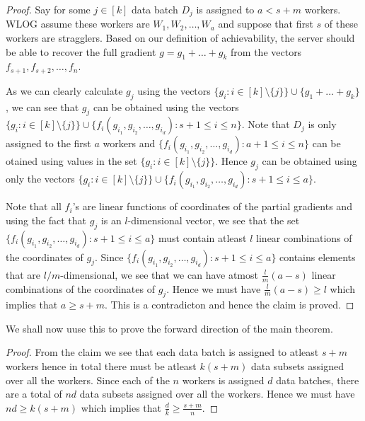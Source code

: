 \documentclass{report}
\theoremstyle{definition}
\begin{document}
\begin{proof}
    Say for some $j \in [k]$ data batch $D_j$ is assigned to $a < s + m$ workers. WLOG assume these workers are $W_1, W_2, \ldots, W_a$ and suppose that first $s$ of these workers are stragglers. Based on our definition of achievability, the server should be able to recover the full gradient $g = g_1 + \ldots + g_k$ from the vectors $f_{s+1}, f_{s+2}, \ldots, f_n$.
    
    As we can clearly calculate $g_j$ using the vectors $\{ g_i : i \in [k] \setminus \{j\} \} \cup \{g_1 + \ldots + g_k\}$, we can see that $g_j$ can be obtained using the vectors $\{ g_i : i \in [k] \setminus \{j\} \} \cup \{f_i(g_{i_1}, g_{i_2}, \ldots, g_{i_d}) : s+1 \leq i \leq n\}$. Note that $D_j$ is only assigned to the first $a$ workers and $\{f_i(g_{i_1}, g_{i_2}, \ldots, g_{i_d}) : a+1 \leq i \leq n\}$ can be otained using values in the set $\{ g_i : i \in [k] \setminus \{j\} \}$. Hence $g_j$ can be obtained using only the vectors $\{ g_i : i \in [k] \setminus \{j\} \} \cup \{f_i(g_{i_1}, g_{i_2}, \ldots, g_{i_d}) : s+1 \leq i \leq a\}$. 

    Note that all $f_i$'s are linear functions of coordinates of the partial gradients and using the fact that $g_j$ is an $l$-dimensional vector, we see that the set $\{f_i(g_{i_1}, g_{i_2}, \ldots, g_{i_d}) : s+1 \leq i \leq a\}$ must contain atleast $l$ linear combinations of the coordinates of $g_j$. Since $\{f_i(g_{i_1}, g_{i_2}, \ldots, g_{i_d}) : s+1 \leq i \leq a\}$ contains elements that are $l/m$-dimensional, we see that we can have atmost $
    \frac{l}{m}(a-s)$ linear combinations of the coordinates of $g_j$. Hence we must have $\frac{l}{m}(a-s) \geq l$ which implies that $a \geq s + m$. This is a contradicton and hence the claim is proved.
\end{proof}

We shall now uuse this to prove the forward direction of the main theorem.

\begin{proof}
    From the claim we see that each data batch is assigned to atleast $s+m$ workers hence in total there must be atleast $k(s+m)$ data subsets assigned over all the workers. Since each of the $n$ workers is assigned $d$ data batches, there are a total of $nd$ data subsets assigned over all the workers. Hence we must have $nd \geq k(s+m)$ which implies that $\frac{d}{k} \geq \frac{s+m}{n}$.
\end{proof}

\end{document}
